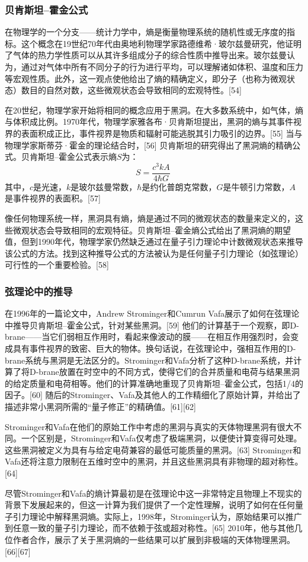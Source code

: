 \subsubsection{贝肯斯坦–霍金公式}  
在物理学的一个分支——统计力学中，熵是衡量物理系统的随机性或无序度的指标。这个概念在19世纪70年代由奥地利物理学家路德维希·玻尔兹曼研究，他证明了气体的热力学性质可以从其许多组成分子的综合性质中推导出来。玻尔兹曼认为，通过对气体中所有不同分子的行为进行平均，可以理解诸如体积、温度和压力等宏观性质。此外，这一观点使他给出了熵的精确定义，即分子（也称为微观状态）数目的自然对数，这些微观状态会导致相同的宏观特性。[54]

在20世纪，物理学家开始将相同的概念应用于黑洞。在大多数系统中，如气体，熵与体积成比例。1970年代，物理学家雅各布·贝肯斯坦提出，黑洞的熵与其事件视界的表面积成正比，事件视界是物质和辐射可能逃脱其引力吸引的边界。[55] 当与物理学家斯蒂芬·霍金的理论结合时，[56] 贝肯斯坦的研究得出了黑洞熵的精确公式。贝肯斯坦–霍金公式表示熵\(S\)为：
\[
S = \frac{c^3 k A}{4 \hbar G}~
\]
其中，\(c\)是光速，\(k\)是玻尔兹曼常数，\(\hbar\)是约化普朗克常数，\(G\)是牛顿引力常数，\(A\)是事件视界的表面积。[57]

像任何物理系统一样，黑洞具有熵，熵是通过不同的微观状态的数量来定义的，这些微观状态会导致相同的宏观特征。贝肯斯坦–霍金熵公式给出了黑洞熵的期望值，但到1990年代，物理学家仍然缺乏通过在量子引力理论中计数微观状态来推导该公式的方法。找到这种推导公式的方法被认为是任何量子引力理论（如弦理论）可行性的一个重要检验。[58]
\subsubsection{弦理论中的推导}  
在1996年的一篇论文中，Andrew Strominger和Cumrun Vafa展示了如何在弦理论中推导贝肯斯坦–霍金公式，针对某些黑洞。[59] 他们的计算基于一个观察，即D-brane——当它们弱相互作用时，看起来像波动的膜——在相互作用强烈时，会变成具有事件视界的致密、巨大的物体。换句话说，在弦理论中，强相互作用的D-brane系统与黑洞是无法区分的。Strominger和Vafa分析了这种D-brane系统，并计算了将D-brane放置在时空中的不同方式，使得它们的合并质量和电荷与结果黑洞的给定质量和电荷相等。他们的计算准确地重现了贝肯斯坦–霍金公式，包括1/4的因子。[60] 随后的Strominger、Vafa及其他人的工作精细化了原始计算，并给出了描述非常小黑洞所需的“量子修正”的精确值。[61][62]

Strominger和Vafa在他们的原始工作中考虑的黑洞与真实的天体物理黑洞有很大不同。一个区别是，Strominger和Vafa仅考虑了极端黑洞，以便使计算变得可处理。这些黑洞被定义为具有与给定电荷兼容的最低可能质量的黑洞。[63] Strominger和Vafa还将注意力限制在五维时空中的黑洞，并且这些黑洞具有非物理的超对称性。[64]

尽管Strominger和Vafa的熵计算最初是在弦理论中这一非常特定且物理上不现实的背景下发展起来的，但这一计算为我们提供了一个定性理解，说明了如何在任何量子引力理论中解释黑洞熵。实际上，1998年，Strominger认为，原始结果可以推广到任意一致的量子引力理论，而不依赖于弦或超对称性。[65] 2010年，他与其他几位作者合作，展示了关于黑洞熵的一些结果可以扩展到非极端的天体物理黑洞。[66][67]

